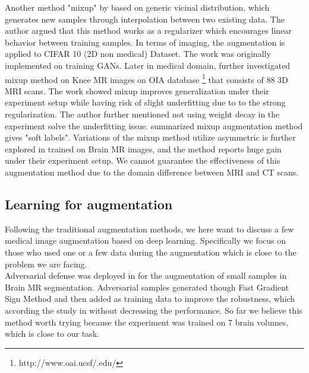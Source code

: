Another method "mixup" by \cite{zhang_mixup_2018} based on generic vicinal distribution, which generates new samples through interpolation between two existing data. The author argued that this method works as a regularizer which encourages linear behavior between training samples. In terms of imaging, the augmentation is applied to CIFAR 10 (2D non medical) Dataset.
The work was originally implemented on training GANs. Later in medical domain, \cite{panfilov_improving_2019} further investigated mixup method on Knee MR images on OIA database \footnote{http://www.oai.ucsf/.edu/} that consists of 88 3D MRI scans. The work showed mixup improves generalization under their experiment setup while having risk of slight underfitting due to to the strong regularization. The author further mentioned not using weight decay in the experiment solve the underfitting issue.
\cite{tajbakhsh_embracing_2020} summarized mixup augmentation method gives "soft labels". Variations of the mixup method utilize asymmetric is further explored in \cite{li_overfitting_2019} trained on Brain MR images, and the method reports huge gain under their experiment setup.
We cannot guarantee the effectiveness of this augmentation method due to the domain difference between MRI and CT scans.

\subsection{Learning for augmentation}
Following the traditional augmentation methods, we here want to discuss a few medical image augmentation based on deep learning. Specifically we focus on those who used one or a few data during the augmentation which is close to the problem we are facing.\\

Adversarial defense was deployed in \cite{suk_brain_2019} for the augmentation of small samples in Brain MR segmentation. Adversarial samples generated though Fast Gradient Sign Method\cite{} and then added as training data to improve the robustness, which according the study in \cite{} without decreasing the performance. So far we believe this method worth trying because the experiment was trained on 7 brain volumes, which is close to our task.\\



